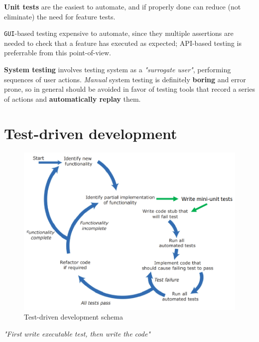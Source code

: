 \textbf{Unit tests} are the easiest to automate, and if properly done
can reduce (not eliminate) the need for feature tests.

\texttt{GUI}-based testing expensive to automate, since they multiple assertions are needed to check that a feature has executed as expected; API-based testing is preferrable from this point-of-view.

\textbf{System testing} involves testing system as a \textit{"surrogate user"}, performing  sequences of user actions.
\textit{Manual} system testing is definitely \textbf{boring} and error prone,
so in general should be avoided in favor of testing tools that record a series of actions and \textbf{automatically replay} them.

\section{Test-driven development}
\begin{figure}[htbp]
   \centering
   \includegraphics{images/testdriven.png}
   \caption{Test-driven development schema}
   \label{fig:testdriven}
\end{figure}

\begin{theorem}
\textit{"First write executable test, then write the code"}
\end{theorem}


